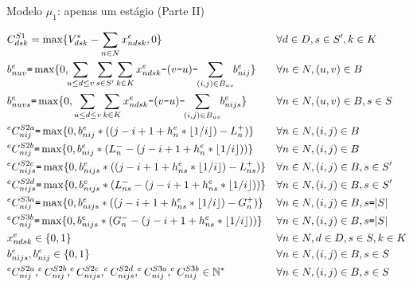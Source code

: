 \documentclass[8pt,mathserif,professionalfont]{beamer}
\begin{document}
\begin{frame}{Modelo $\mu_1$: apenas um estágio (Parte II)}
\begin{samepage}
\begin{align}
& C^{S1}_{dsk} = \max\{ V^*_{dsk} - \sum_{n \in N} x^e_{ndsk}, 0\} && \forall d \in D, s \in S', k \in K \label{eS1} \\
& b^e_{nuv} \texttt{=} \max \{0, \hspace{-1mm}\sum_{u \leq d \leq v} \sum_{s \in S'} \sum_{k \in K} x^e_{ndsk} \texttt{-} (v \texttt{-}u) \texttt{-}\hspace{-1mm} \sum_{(i,j) \in B_{uv}}\hspace{-1mm} b^e_{nij}\} && \forall n \in N, (u,v) \in B \label{eS2aux1} \\
& b^e_{nuvs} \texttt{=} \max \{0, \sum_{u \leq d \leq v} \sum_{k \in K} x^e_{ndsk} \texttt{-} (v \texttt{-}u) \texttt{-} \hspace{-1mm}\sum_{(i,j) \in B_{uv}} \hspace{-1mm} b^e_{nijs}\} && \forall n \in N, (u,v) \in B, s \in S \label{eS2aux2} \\
& ^eC^{S2a}_{nij} \texttt{=}  \max\{0, b^e_{nij} * ((j - i +1 + h^e_{n}*\lfloor 1/i \rfloor) - L^+_{n})\} && \forall n \in N, (i,j) \in B \label{eS2a} \\
& ^eC^{S2b}_{nij} \texttt{=}  \max\{0, b^e_{nij} * (L^-_{n} - (j - i +1  + h^e_{n}*\lfloor 1/i \rfloor))\} && \forall n \in N, (i,j) \in B \label{eS2b} \\
& ^eC^{S2c}_{nijs} \texttt{=}  \max\{0, b^e_{nijs} * ((j - i +1  + h^e_{ns}*\lfloor 1/i \rfloor) - L^+_{ns})\} && \forall n \in N, (i,j) \in B, s \in S'\label{eS2c} \\
& ^eC^{S2d}_{nijs} \texttt{=}  \max\{0, b^e_{nijs} * (L^-_{ns} - (j - i +1 + h^e_{ns}*\lfloor 1/i \rfloor))\} && \forall n \in N, (i,j) \in B, s \in S' \label{eS2d} \\
& ^eC^{S3a}_{nij} \texttt{=}  \max\{0, b^e_{nijs} * ((j - i +1  + h^e_{ns}*\lfloor 1/i \rfloor) - G^+_{n})\} && \forall n \in N, (i,j) \in B, s \texttt{=} |S|\label{eS3a} \\
& ^eC^{S3b}_{nij} \texttt{=}  \max\{0, b^e_{nijs} * (G^-_{n} - (j - i +1  + h^e_{ns}*\lfloor 1/i \rfloor))\} && \forall n \in N, (i,j) \in B, s \texttt{=} |S| \label{eS3b} \\
& x^e_{ndsk} \in \{0,1\}  &&  \forall n \in N, d \in D, s \in S, k \in K  \notag  \\
& b^e_{nijs},  b^e_{nij} \in \{0,1\}  &&  \forall n \in N, (i,j) \in B, s \in S \notag \\
& ^eC^{S2a}_{nij}, ^eC^{S2b}_{nij}, ^eC^{S2c}_{nijs}, ^eC^{S2d}_{nijs}, ^eC^{S3a}_{nij}, ^eC^{S3b}_{nij} \in \mathbb{N^*} && \forall n \in N, (i,j) \in B, s \in S \notag 
\end{align}
\end{samepage}


\end{frame}
\end{document}

